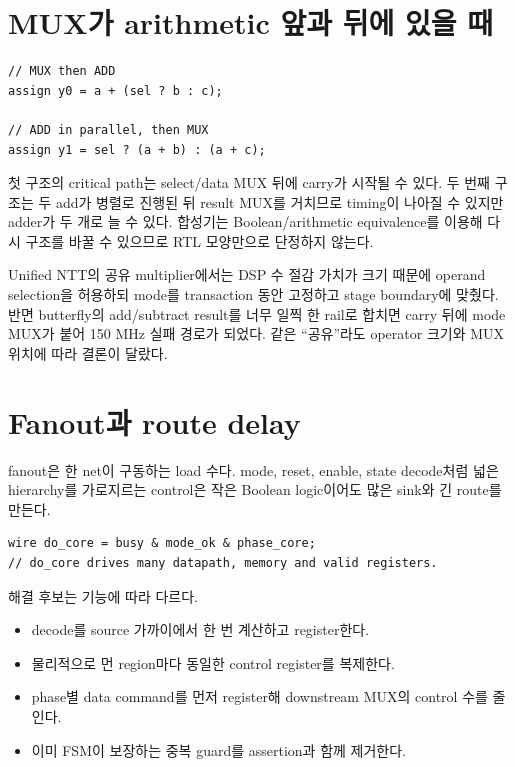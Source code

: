 \section{MUX가 arithmetic 앞과 뒤에 있을 때}

\begin{lstlisting}
// MUX then ADD
assign y0 = a + (sel ? b : c);

// ADD in parallel, then MUX
assign y1 = sel ? (a + b) : (a + c);
\end{lstlisting}

첫 구조의 critical path는 select/data MUX 뒤에 carry가 시작될 수 있다. 두 번째
구조는 두 add가 병렬로 진행된 뒤 result MUX를 거치므로 timing이 나아질 수 있지만
adder가 두 개로 늘 수 있다. 합성기는 Boolean/arithmetic equivalence를 이용해
다시 구조를 바꿀 수 있으므로 RTL 모양만으로 단정하지 않는다.

Unified NTT의 공유 multiplier에서는 DSP 수 절감 가치가 크기 때문에 operand
selection을 허용하되 mode를 transaction 동안 고정하고 stage boundary에 맞췄다.
반면 butterfly의 add/subtract result를 너무 일찍 한 rail로 합치면 carry 뒤에
mode MUX가 붙어 150 MHz 실패 경로가 되었다. 같은 ``공유''라도 operator 크기와
MUX 위치에 따라 결론이 달랐다.

\section{Fanout과 route delay}

fanout은 한 net이 구동하는 load 수다. mode, reset, enable, state decode처럼 넓은
hierarchy를 가로지르는 control은 작은 Boolean logic이어도 많은 sink와 긴 route를
만든다.

\begin{lstlisting}
wire do_core = busy & mode_ok & phase_core;
// do_core drives many datapath, memory and valid registers.
\end{lstlisting}

해결 후보는 기능에 따라 다르다.

\begin{itemize}
  \item decode를 source 가까이에서 한 번 계산하고 register한다.
  \item 물리적으로 먼 region마다 동일한 control register를 복제한다.
  \item phase별 data command를 먼저 register해 downstream MUX의 control 수를 줄인다.
  \item 이미 FSM이 보장하는 중복 guard를 assertion과 함께 제거한다.
\end{itemize}

